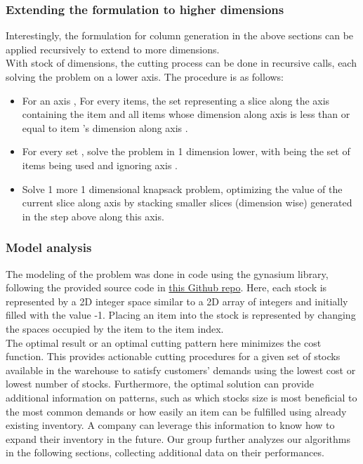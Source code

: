\documentclass[a4paper]{article}
\begin{document}
    \subsubsection{Extending the formulation to higher dimensions}
    \noindent Interestingly, the formulation for column generation in the above sections can be applied recursively to extend to more dimensions.
    \vspace{0.2cm}\\
    With stock of  dimensions, the cutting process can be done in  recursive calls, each solving the problem on a lower axis. The procedure is as follows:
    \begin{itemize}
        \item For an axis , For every items, the set  representing a slice along the axis  containing the item  and all items whose dimension along axis  is less than or equal to item 's dimension along axis .
        \item For every set , solve the problem in 1 dimension lower, with  being the set of items being used and ignoring axis .
        \item Solve 1 more 1 dimensional knapsack problem, optimizing the value of the current slice along axis  by stacking smaller slices (dimension wise) generated in the step above along this axis.
    \end{itemize} 

    \subsubsection{Model analysis}
    The modeling of the problem was done in code using the gynasium library, following the provided source code in \href{https://github.com/martinakaduc/MM241-Assignment}{this Github repo}. Here, each stock is represented by a 2D integer space similar to a 2D array of integers and initially filled with the value -1. Placing an item into the stock is represented by changing the spaces occupied by the item to the item index. 
    \vspace{0.2cm} \\
    The optimal result or an optimal cutting pattern here minimizes the cost function. This provides actionable cutting procedures for a given set of stocks available in the warehouse to satisfy customers' demands using the lowest cost or lowest number of stocks. 
    Furthermore, the optimal solution can provide additional information on patterns, such as which stocks size is most beneficial to the most common demands or how easily an item can be fulfilled using already existing inventory. A company can leverage this information to know how to expand their inventory in the future.
    Our group further analyzes our algorithms in the following sections, collecting additional data on their performances. 
\end{document}
